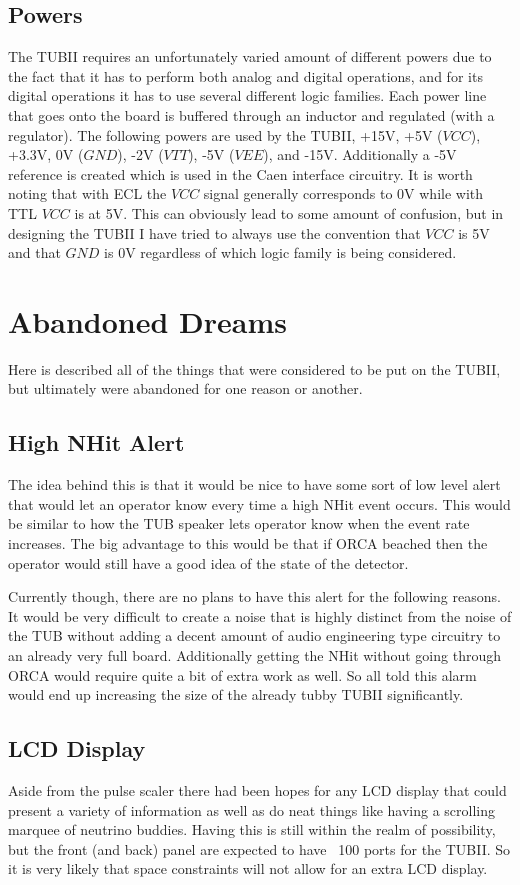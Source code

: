 \documentclass[11pt,a4paper]{article}
\begin{document}
\subsection{Powers}
The TUBII requires an unfortunately varied amount of different powers due to the fact that it has to perform both analog and digital operations, and for its digital operations it has to use several different logic families. Each power line that goes onto the board is buffered through an inductor and regulated (with a regulator). The following powers are used by the TUBII, +15V, +5V ($VCC$), +3.3V, 0V ($GND$), -2V ($VTT$), -5V ($VEE$), and -15V. Additionally a -5V reference is created which is used in the Caen interface circuitry. It is worth noting that with ECL the $VCC$ signal generally corresponds to 0V while with TTL $VCC$ is at 5V. This can obviously lead to some amount of confusion, but in designing the TUBII I have tried to always use the convention that $VCC$ is 5V and that $GND$ is 0V regardless of which logic family is being considered.

\section{Abandoned Dreams}
Here is described all of the things that were considered to be put on the TUBII, but ultimately were abandoned for one reason or another.
\subsection{High NHit Alert}
The idea behind this is that it would be nice to have some sort of low level alert that would let an operator know every time a high NHit event occurs. This would be similar to how the TUB speaker lets operator know when the event rate increases. The big advantage to this would be that if ORCA beached then the operator would still have a good idea of the state of the detector.

Currently though, there are no plans to have this alert for the following reasons. It would be very difficult to create a noise that is highly distinct from the noise of the TUB without adding a decent amount of audio engineering type circuitry to an already very full board. Additionally getting the NHit without going through ORCA would require quite a bit of extra work as well. So all told this alarm would end up increasing the size of the already tubby TUBII significantly.

\subsection{LCD Display}
Aside from the pulse scaler there had been hopes for any LCD display that could present a variety of information as well as do neat things like having a scrolling marquee of neutrino buddies. Having this is still within the realm of possibility, but the front (and back) panel are expected to have ~100 ports for the TUBII. So it is very likely that space constraints will not allow for an extra LCD display.
\end{document}

